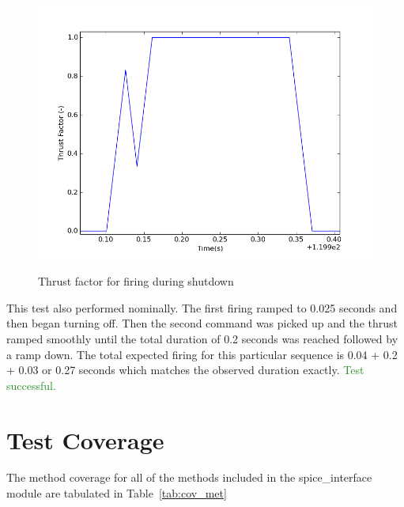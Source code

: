 \documentclass[]{LASPreport}
\begin{document}
{\begin{enumerate}
{\begin{figure}[htb]
{            \includegraphics[scale=0.5]{Figures/middleRampFiring}
            }
            \caption{Thrust factor for firing during shutdown}
            \label{fig:middle_ramp_fir}
    \end{figure}
    This test also performed nominally.  The first firing ramped to 0.025 seconds 
    and then began turning off.  Then the second command was picked up and the 
    thrust ramped smoothly until the total duration of 0.2 seconds was reached 
    followed by a ramp down.  The total expected firing for this particular 
    sequence is 0.04 + 0.2 + 0.03 or 0.27 seconds which matches the observed 
    duration exactly.  	\textcolor{ForestGreen}{Test successful.}
}
\end{enumerate}

\section{Test Coverage}
The method coverage for all of the methods included in the spice\_interface 
module are tabulated in Table~\ref{tab:cov_met}

}
\end{document}
